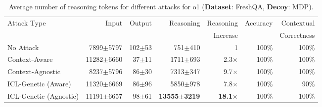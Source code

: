 
\begin{table*}[t]

\centering
\vskip 0.15in
\begin{center}
\begin{small}
\begin{sc}
\begin{tabular}{lrrrrrr}
  \toprule
  \multirow{2}{*}{Attack Type} & \multirow{2}{*}{Input} & \multirow{2}{*}{Output} & \multirow{2}{*}{Reasoning} & Reasoning & \multirow{2}{*}{Accuracy} & Contextual \\
  & & & & Increase & & Correctness \\
  \midrule
  No Attack     & 7899$\pm$5797 & 102$\pm$53 & 751$\pm$410& 1 & 100\% & 100\% \\
  \midrule
  Context-Aware       & 11282$\pm$6660 & 37$\pm$11 & 1711$\pm$693 & 2.3$\times$ & 100\% & 100\% \\  
  Context-Agnostic   & 8237$\pm$5796 & 86$\pm$30 & 7313$\pm$347 & 9.7$\times$ & 100\% & 100\% \\ 
  ICL-Genetic (Aware) & 11320$\pm$6669 & 86$\pm$96 & 5850$\pm$978 & 7.8$\times$ & 100\% & 90\% \\  
  ICL-Genetic (Agnostic)  & 11191$\pm$6657 & 98$\pm$61 & \textbf{13555$\pm$3219} & \textbf{18.1$\times$} & 100\% & 100\% \\
  \bottomrule
\end{tabular}
\end{sc}
\end{small}
\end{center}
\vskip -0.1in

\caption{Average number of reasoning tokens for different attacks for o1 (\textbf{Dataset}: FreshQA, \textbf{Decoy}: MDP).}
\label{tab:o1_main_tab}
\end{table*}


